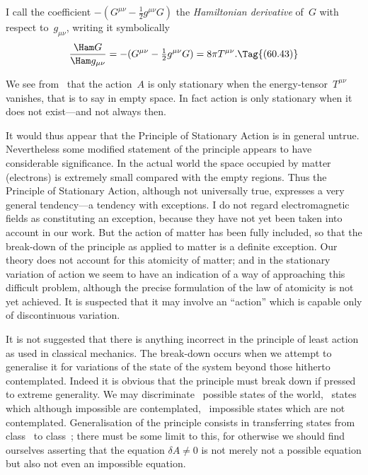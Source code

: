 \documentclass[12pt]{book}
\begin{document}
I call the coefficient $-(G^{\mu\nu} - \frac{1}{2}g^{\mu\nu}G)$ the \emph{Hamiltonian derivative} of~$G$ with
%
%
%
respect to~$g_{\mu\nu}$, writing it symbolically
\[
\frac{\Ham G}{\Ham g_{\mu\nu}}
  = -(G^{\mu\nu} - \tfrac{1}{2}g^{\mu\nu}G)
  = 8\pi T^{\mu\nu}.
  \Tag{(60.43)}
\]

We see from~ that the action~$A$ is only stationary when the energy\hyp{}tensor~$T^{\mu\nu}$
%
%
vanishes, that is to say in empty space. In fact action is only
stationary when it does not exist---and not always then.

It would thus appear that the Principle of Stationary Action is in general
%
untrue. Nevertheless some modified statement of the principle appears to
have considerable significance. In the actual world the space occupied by
matter (electrons) is extremely small compared with the empty regions. Thus
the Principle of Stationary Action, although not universally true, expresses a
very general tendency---a tendency with exceptions\footnotemark.\footnotetext
  {I do not regard electromagnetic fields as constituting an exception, because they have not
  yet been taken into account in our work. But the action of matter has been fully included, so
  that the break\hyp{}down of the principle as applied to matter is a definite exception.}
Our theory does not
account for this atomicity of matter; and in the stationary variation of action
%
we seem to have an indication of a way of approaching this difficult problem,
although the precise formulation of the law of atomicity is not yet achieved.
It is suspected that it may involve an ``action'' which is capable only of
discontinuous variation.

It is not suggested that there is anything incorrect in the principle of
least action as used in classical mechanics. The break-down occurs when we
attempt to generalise it for variations of the state of the system beyond those
hitherto contemplated. Indeed it is obvious that the principle must break
down if pressed to extreme generality. We may discriminate ~possible
states of the world, ~states which although impossible are contemplated,
~impossible states which are not contemplated. Generalisation of the principle
consists in transferring states from class~ to class~; there must be
some limit to this, for otherwise we should find ourselves asserting that the
equation $\delta A \neq 0$ is not merely not a possible equation but also not even an
impossible equation.
\end{document}
